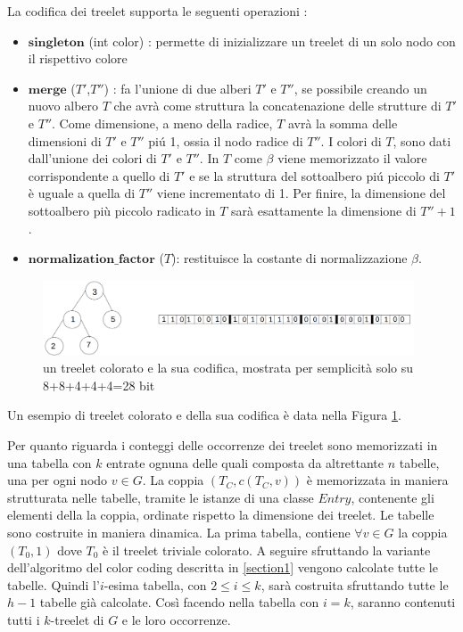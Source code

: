 La codifica dei treelet supporta le seguenti operazioni :
\begin{itemize}
	\item $ \textbf{singleton} $ (int color) : permette di inizializzare un treelet di un solo nodo con il rispettivo colore
	\item $ \textbf{merge} $ ($ T' $,$ T'' $) : fa l'unione di due alberi $ T' $ e $ T'' $, se possibile creando un nuovo albero $ T $ che avr\`a come struttura la concatenazione delle strutture di $ T' $ e $ T'' $.
	Come dimensione, a meno della radice, $ T $ avr\`a la somma delle dimensioni di $ T' $ e $ T'' $ pi\'u 1, ossia il nodo radice di $ T'' $.
	I colori di $ T $, sono dati dall'unione dei colori di $ T' $ e $ T'' $.
	In $ T $ come $ \beta $ viene memorizzato il valore corrispondente a quello di $ T' $ e se la struttura del sottoalbero pi\'u piccolo di $ T' $ \`e uguale a quella di $ T'' $ viene incrementato di 1. Per finire, la dimensione del sottoalbero pi\`u piccolo radicato in $ T $ sar\`a esattamente la dimensione di $ T''+1  $ .
	\item $\textbf{normalization\_factor}$ ($ T $): restituisce la costante di normalizzazione $ \beta $.
	    
\end{itemize}
\begin{figure}[htbp]
	\centering
	\includegraphics[width=11cm]{capitolo2/grafo4}
	\caption{un treelet colorato e la sua codifica, mostrata per semplicit\`a solo su 8+8+4+4+4=28 bit}
	\label{figura1}
\end{figure}
Un esempio di treelet colorato e della sua codifica \`e data nella Figura \ref{figura1}.



Per quanto riguarda i conteggi delle occorrenze dei treelet sono memorizzati in una tabella con $ k $  entrate ognuna delle quali composta da altrettante $ n $ tabelle, una per ogni nodo $ v \in G $.
La coppia $ (T_C,c(T_C,v)) $ \`e memorizzata in maniera strutturata nelle tabelle, tramite le istanze di una classe $ Entry $, contenente gli elementi della la coppia,  ordinate rispetto la dimensione dei treelet.
Le tabelle sono costruite in maniera dinamica.
La prima tabella, contiene  $ \forall v \in G $ la coppia $ (T_0,1) $ dove $ T_0 $ \`e il treelet triviale colorato.
A seguire sfruttando la variante dell'algoritmo del color coding descritta in \ref{section1} vengono calcolate tutte le tabelle.
Quindi l'$ i$-esima tabella, con $ 2 \le i \le k $, sar\`a costruita sfruttando tutte le $ h-1 $ tabelle gi\`a calcolate.
Cos\`i facendo nella tabella con $ i = k $, saranno contenuti tutti i $ k $-treelet di $ G $ e le loro occorrenze.



	
